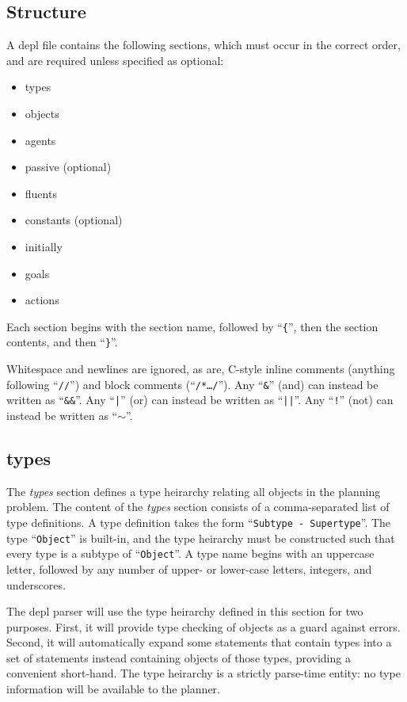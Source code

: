 \documentclass{article}
\begin{document}
{\subsection{Structure}

A depl file contains the following sections, which must occur in the correct
order, and are required unless specified as optional:

\begin{itemize}
\item types
\item objects
\item agents
\item passive (optional)
\item fluents
\item constants (optional)
\item initially
\item goals
\item actions
\end{itemize}

\noindent
Each section begins with the section name, followed by
``\verb|{|'', 
then the section contents, and then
``\verb|}|''. 

Whitespace and newlines are ignored,
as are, C-style inline comments (anything
following ``\texttt{//}'') and block comments (``\texttt{/*\ldots*/}'').
Any
``\texttt{\&}''
(and) can instead be written as
``\texttt{\&\&}''.
Any
``\texttt{|}''
(or) can instead be written as
``\texttt{||}''.
Any
``\texttt{!}''
(not) can instead be written as
``$\sim$''.


\subsection{types}

The \emph{types} section defines a type heirarchy relating all objects in the planning
problem.
The content of the \emph{types} section consists of a comma-separated list of
type definitions. A type definition takes the form
``\texttt{Subtype - Supertype}''.
The type ``\texttt{Object}'' is built-in, and
the type heirarchy must be constructed such that every type is a subtype of
``\texttt{Object}''.  A type name begins with an uppercase letter, followed
by any number of upper- or lower-case letters, integers, and underscores.

The depl parser will use the type heirarchy defined in this section for two 
purposes. First, it will provide type checking of objects as a guard against errors.
Second, it will automatically expand some
statements that contain types into a set of statements instead containing
objects of those types, providing a convenient short-hand. 
The type heirarchy is a strictly parse-time entity: no type information will be
available to the planner.


}
\end{document}
